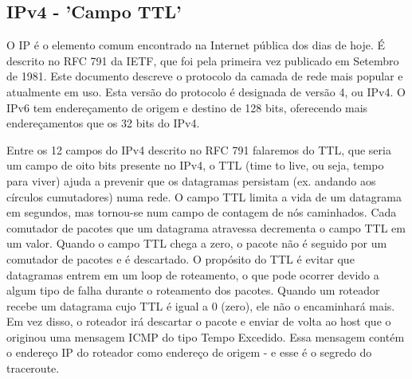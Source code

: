 \documentclass[
	article,			%
	11pt,				%
	oneside,			%
	a4paper,			%
	section=TITLE,		%
	english,			%
	brazil,				%
	sumario=tradicional
	]{abntex2}
\begin{document}
\subsection{IPv4 - 'Campo TTL'}
O IP é o elemento comum encontrado na Internet pública dos dias de hoje. É descrito no RFC 791 da IETF, que foi pela primeira vez publicado em Setembro de 1981. Este documento descreve o protocolo da camada de rede mais popular e atualmente em uso. Esta versão do protocolo é designada de versão 4, ou IPv4. O IPv6 tem endereçamento de origem e destino de 128 bits, oferecendo mais endereçamentos que os 32 bits do IPv4.

Entre os 12 campos do IPv4 descrito no RFC 791 falaremos do TTL, que seria um campo de oito bits presente no IPv4, o TTL (time to live, ou seja, tempo para viver) ajuda a prevenir que os datagramas persistam (ex. andando aos círculos cumutadores) numa rede. O campo TTL limita a vida de um datagrama em segundos, mas tornou-se num campo de contagem de nós caminhados. Cada comutador de pacotes que um datagrama atravessa decrementa o campo TTL em um valor. Quando o campo TTL chega a zero, o pacote não é seguido por um comutador de pacotes e é descartado.
O propósito do TTL é evitar que datagramas entrem em um loop de roteamento, o que pode ocorrer devido a algum tipo de falha durante o roteamento dos pacotes. Quando um roteador recebe um datagrama cujo TTL é igual a 0 (zero), ele não o encaminhará mais. Em vez disso, o roteador irá descartar o pacote e enviar de volta ao host que o originou uma mensagem ICMP do tipo Tempo Excedido. Essa mensagem contém o endereço IP do roteador como endereço de origem - e esse é o segredo do traceroute.\cite{boson}
\end{document}
